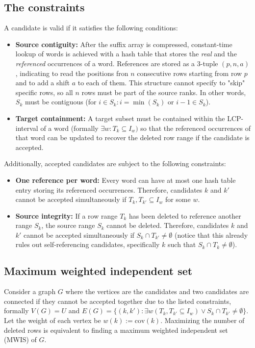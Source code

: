 \documentclass[11pt,a4paper]{article}
\begin{document}
\subsection{The constraints}

A candidate is valid if it satisfies the following conditions:
\begin{itemize}
    \item \textbf{Source contiguity:} After the suffix array is compressed, constant-time lookup of words is achieved with a hash table that stores the \emph{real} and the \emph{referenced} occurrences of a word. References are stored as a 3-tuple $(p, n, a)$, indicating to read the positions fron $n$ consecutive rows starting from row $p$ and to add a shift $a$ to each of them. This structure cannot specify to "skip" specific rows, so all $n$ rows must be part of the source ranks. In other words, $S_k$ must be contiguous (for $i \in S_k: i = \min(S_k) \text{ or } i-1 \in S_k$).
    \item \textbf{Target containment:} A target subset must be contained within the LCP-interval of a word (formally $\exists w : T_k \subseteq I_w)$ so that the referenced occurrences of that word can be updated to recover the deleted row range if the candidate is accepted.
\end{itemize}

Additionally, accepted candidates are subject to the following constraints: 
\begin{itemize}
    \item \textbf{One reference per word:}  Every word can have at most one hash table entry storing its referenced occurrences. Therefore, candidates $k$ and $k'$ cannot be accepted simultaneously if $T_k, T_{k'} \subseteq I_w$ for some $w$.
    \item \textbf{Source integrity:} If a row range $T_k$ has been deleted to reference another range $S_k$, the source range $S_k$ cannot be deleted. Therefore, candidates $k$ and $k'$ cannot be accepted simultaneously if $S_k \cap T_{k'} \neq \emptyset$ (notice that this already rules out self-referencing candidates, specifically $k$ such that $S_k \cap T_k \neq \emptyset$).
\end{itemize}

\subsection{Maximum weighted independent set}

Consider a graph $G$ where the vertices are the candidates and two candidates are connected if they cannot be accepted together due to the listed constraints, formally $V(G) = U$ and $E(G) = \{(k, k'): \exists w( T_k, T_{k'} \subseteq I_w) \lor S_k \cap T_{k'} \neq \emptyset \}$. Let the weight of each vertex be $w(k) :=\mathrm{cov}(k)$. Maximizing the number of deleted rows is equivalent to finding a maximum weighted independent set (MWIS) of $G$.
\end{document}
